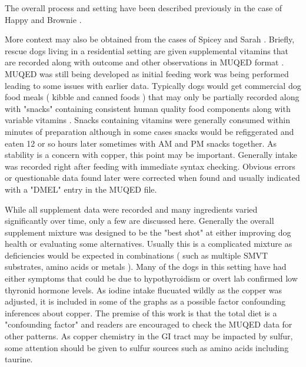 \mjmdogsone

The overall process and setting  have been described previously
in the case of Happy
\cite{marchywka-MJM-2022-009-0.50rg}
\cite{mmarchywka-MJM-2019-001-.1li}
 and Brownie
\cite{mmarchywka-MJM-2021-003-v0.50rg}.

More context may also be obtained from the
cases of Spicey \cite{mmarchywka-MJM-2020-007rg}
and Sarah \cite{marchywka-MJM-2022-002-0.50rg}.
Briefly, rescue dogs living in a residential setting
are given supplemental vitamins that are recorded along
with outcome and other observations in MUQED format 
\cite{mmarchywka-MJM-2020-004-.012rg}.
MUQED was still being developed as initial feeding work 
was being performed leading to some issues with earlier data.
Typically dogs would get commercial dog food meals 
( kibble and canned foods ) 
that may only be partially recorded along with "snacks"
containing consistent human quality food components along with variable
 vitamins \cite{marchywka-MJM-2021-018-0.50rg}.
Snacks containing vitamins were generally consumed within minutes
of preparation although in some cases snacks would be refiggerated
and eaten 12 or so hours later sometimes with AM and PM snacks together.
As stability is a concern with copper, this point may be important.
Generally intake was recorded right after feeding with immediate
syntax checking. Obvious errors or questionable data found later
were corrected when found and usually indicated with a "DMEL" entry
in the MUQED file. 


While all supplement data were recorded and many
ingredients  varied significantly over time, only a few are discussed here. 
Generally the overall supplement mixture was designed to be the "best shot"
at either improving dog health or evaluating some alternatives.
Usually this is a complicated mixture as deficiencies would be expected
in combinations ( such as multiple SMVT substrates, amino acids or metals ). 
Many of the dogs in this setting have had either symptoms
that could be due to hypothyroidism or overt lab confirmed
low thyronid hormone levels. As iodine intake flucuated 
wildly as the copper was adjusted, it is included in some of the graphs as 
a possible factor confounding inferences about copper. 
The premise of this work is that the total diet is
a "confounding factor" and readers are encouraged to check
the MUQED data for other patterns. As copper chemistry in the
GI tract may be impacted by sulfur, some attention should
be given to sulfur sources such as amino acids including taurine.  


